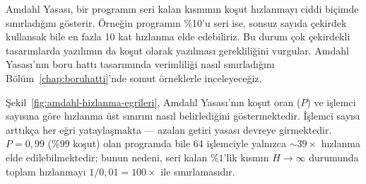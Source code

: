 \begin{bilginot}
Amdahl Yasası, bir programın seri kalan kısmının koşut hızlanmayı ciddi biçimde sınırladığını gösterir. Örneğin programın \%10'u seri ise, sonsuz sayıda çekirdek kullansak bile en fazla 10 kat hızlanma elde edebiliriz. Bu durum çok çekirdekli tasarımlarda yazılımın da koşut olarak yazılması gerekliliğini vurgular. Amdahl Yasası'nın boru hattı tasarımında verimliliği nasıl sınırladığını Bölüm~\ref{chap:boruhatti}'nde somut örneklerle inceleyeceğiz.
\end{bilginot}

Şekil~\ref{fig:amdahl-hizlanma-egrileri}, Amdahl Yasası'nın koşut oran ($P$) ve işlemci sayısına göre hızlanma üst sınırını nasıl belirlediğini göstermektedir. İşlemci sayısı arttıkça her eğri yataylaşmakta --- azalan getiri yasası devreye girmektedir. $P=0{,}99$ ($\%99$ koşut) olan programda bile 64 işlemciyle yalnızca $\sim$$39\times$ hızlanma elde edilebilmektedir; bunun nedeni, seri kalan $\%1$'lik kısmın $H\to\infty$ durumunda toplam hızlanmayı $1/0{,}01 = 100\times$ ile sınırlamasıdır.

